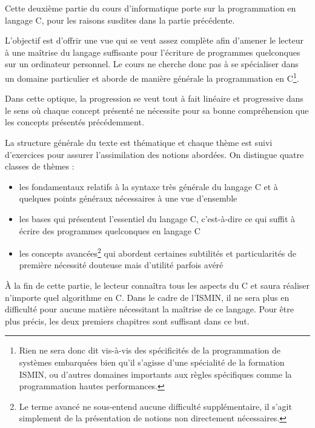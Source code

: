 \documentclass[../../main.tex]{subfiles}
\begin{document}
Cette deuxième partie du cours d'informatique porte sur la programmation en langage C, pour les raisons susdites dans la partie précédente.
 
L'objectif est d'offrir une vue qui se veut assez complète afin d'amener le lecteur à une maîtrise du langage suffisante pour l'écriture de programmes quelconques sur un ordinateur personnel. Le cours ne cherche donc pas à se spécialiser dans un domaine particulier et aborde de manière générale la programmation en C\footnote{Rien ne sera donc dit vis-à-vis des spécificités de la programmation de systèmes embarquées bien qu'il s'agisse d'une spécialité de la formation ISMIN, ou d'autres domaines importants aux règles spécifiques comme la programmation hautes performances.}.

Dans cette optique, la progression se veut tout à fait linéaire et progressive dans le sens où chaque concept présenté ne nécessite pour sa bonne compréhension que les concepts présentés précédemment.

La structure générale du texte est thématique et chaque thème est suivi d'exercices pour assurer l'assimilation des notions abordées. On distingue quatre classes de thèmes :
\begin{itemize}
	\item les fondamentaux relatifs à la syntaxe très générale du langage C et à quelques points généraux nécessaires à une vue d'ensemble
	\item les bases qui présentent l'essentiel du langage C, c'est-à-dire ce qui suffit à écrire des programmes quelconques en langage C
	\item les concepts avancées\footnote{Le terme \og avancé \fg ne sous-entend aucune difficulté supplémentaire, il s'agit simplement de la présentation de notions non directement nécessaires.} qui abordent certaines subtilités et particularités de première nécessité douteuse mais d'utilité parfois avéré
\end{itemize}
À la fin de cette partie, le lecteur connaîtra tous les aspects du C et saura réaliser n'importe quel algorithme en C. Dans le cadre de l'ISMIN, il ne sera plus en difficulté pour aucune matière nécessitant la maîtrise de ce langage. Pour être plus précis, les deux premiers chapitres sont suffisant dans ce but.
\end{document}
